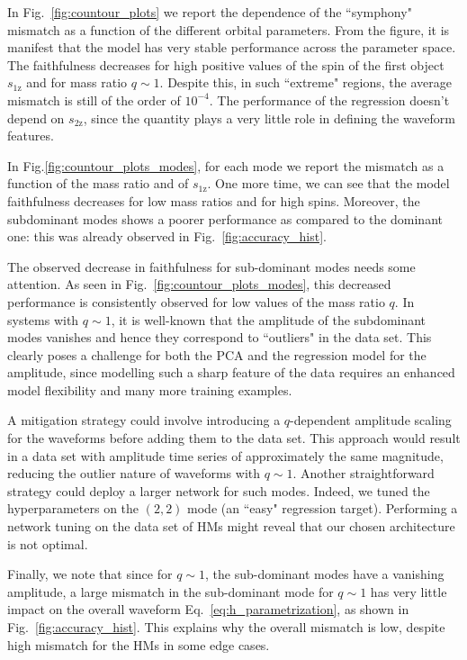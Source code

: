 \documentclass[twocolumn,showpacs,preprintnumbers,nofootinbib,prd,
superscriptaddress,10pt]{revtex4-1}
\begin{document}
{In Fig.~\ref{fig:countour_plots} we report the dependence of the ``symphony" mismatch as a function of the different orbital parameters.
From the figure, it is manifest that the model has very stable performance across the parameter space.
The faithfulness decreases for high positive values of the spin of the first object $s_\text{1z}$ and for mass ratio $q\sim 1$. Despite this, in such ``extreme" regions, the average mismatch is still of the order of $10^{-4}$.
The performance of the regression doesn't depend on $s_\text{2z}$, since the quantity plays a very little role in defining the waveform features.

In Fig.\ref{fig:countour_plots_modes}, for each mode we report the mismatch as a function of the mass ratio and of $s_\text{1z}$. One more time, we can see that the model faithfulness decreases for low mass ratios and for high spins. Moreover, the subdominant modes shows a poorer performance as compared to the dominant one: this was already observed in Fig.~\ref{fig:accuracy_hist}.

The observed decrease in faithfulness for sub-dominant modes needs some attention.
As seen in Fig.~\ref{fig:countour_plots_modes}, this decreased performance is consistently observed for low values of the mass ratio $q$. 
In systems with $q \sim 1$, it is well-known that the amplitude of the subdominant modes vanishes and hence they correspond to ``outliers" in the data set.
This clearly poses a challenge for both the PCA and the regression model for the amplitude, since modelling such a sharp feature of the data requires an enhanced model flexibility and many more training examples.

A mitigation strategy could involve introducing a $q$-dependent amplitude scaling for the waveforms before adding them to the data set. This approach would result in a data set with amplitude time series of approximately the same magnitude, reducing the outlier nature of waveforms with $q \sim 1$.
Another straightforward strategy could deploy a larger network for such modes. Indeed, we tuned the hyperparameters on the $(2,2)$ mode (an ``easy" regression target). Performing a network tuning on the data set of HMs might reveal that our chosen architecture is not optimal.

Finally, we note that since for $q\sim 1$, the sub-dominant modes have a vanishing amplitude, a large mismatch in the 
sub-dominant mode for $q\sim 1$ has very little impact on the overall waveform Eq.~\eqref{eq:h_parametrization}, 
as shown in Fig.~\ref{fig:accuracy_hist}.
This explains why the overall mismatch is low, despite high mismatch for the HMs in some edge cases.

}
\end{document}
